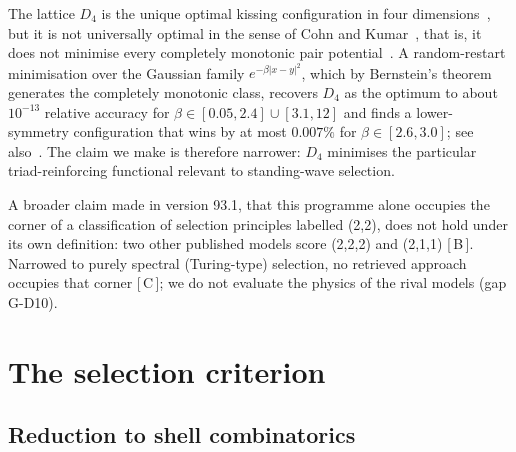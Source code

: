 \documentclass[a4paper,11pt]{article}
\numberwithin{equation}{section}
\theoremstyle{jsplain}
\theoremstyle{jsrem}
\newcommand{\grade}[1]{[\,#1\,]}
\begin{document}
The lattice $D_4$ is the unique optimal kissing configuration in four dimensions~\cite{ref7}, but it is not universally optimal in the sense of Cohn and Kumar~\cite{ref43}, that is, it does not minimise every completely monotonic pair potential~\cite{ref13}. A random-restart minimisation over the Gaussian family $e^{-\beta|x-y|^2}$, which by Bernstein's theorem~\cite{ref12} generates the completely monotonic class, recovers $D_4$ as the optimum to about $10^{-13}$ relative accuracy for $\beta\in[0.05,2.4]\cup[3.1,12]$ and finds a lower-symmetry configuration that wins by at most $0.007\%$ for $\beta\in[2.6,3.0]$; see also~\cite{ref14}. The claim we make is therefore narrower: $D_4$ minimises the particular triad-reinforcing functional relevant to standing-wave selection.

A broader claim made in version 93.1, that this programme alone occupies the corner of a classification of selection principles labelled (2,2), does not hold under its own definition: two other published models score (2,2,2) and (2,1,1) \grade{B}. Narrowed to purely spectral (Turing-type) selection, no retrieved approach occupies that corner \grade{C}; we do not evaluate the physics of the rival models (gap G-D10).

\section{The selection criterion}\label{sec:selection}

\subsection{Reduction to shell combinatorics}
\end{document}
